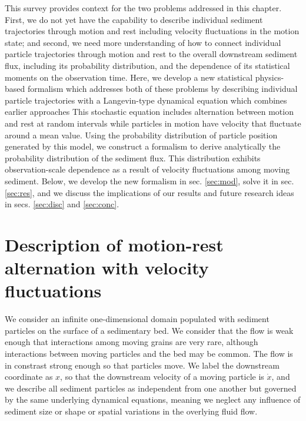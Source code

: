 This survey provides context for the two problems addressed in this chapter. First, we do not yet have the capability to describe individual sediment trajectories through motion and rest including velocity fluctuations in the motion state; and second, we need more understanding of how to connect individual particle trajectories through motion and rest to the overall downstream sediment flux, including its probability distribution, and the dependence of its statistical moments on the observation time.
Here, we develop a new statistical physics-based formalism which addresses both of these problems by describing individual particle trajectories with a Langevin-type dynamical equation which combines earlier approaches \citep{Fan2014,Ancey2014,Lisle1998,Lajeunesse2017}
This stochastic equation includes alternation between motion and rest at random intervals while particles in motion have velocity that fluctuate around a mean value.
Using the probability distribution of particle position generated by this model, we construct a formalism to derive analytically the probability distribution of the sediment flux. This distribution exhibits observation-scale dependence as a result of velocity fluctuations among moving sediment.
Below, we develop the new formalism in sec. \ref{sec:mod}, solve it in sec. \ref{sec:res}, and we discuss the implications of our results and future research ideas in secs. \ref{sec:disc} and \ref{sec:conc}.

\section{Description of motion-rest alternation with velocity fluctuations \label{sec:mod}}
We consider an infinite one-dimensional domain populated with sediment particles on the surface of a sedimentary bed. We consider that the flow is weak enough that interactions among moving grains are very rare, although interactions between moving particles and the bed may be common. The flow is in constrast strong enough so that particles move.
We label the downstream coordinate as $x$, so that the downstream velocity of a moving particle is $\dot{x}$, and we describe all sediment particles as independent from one another but governed by the same underlying dynamical equations, meaning we neglect any influence of sediment size or shape or spatial variations in the overlying fluid flow.

